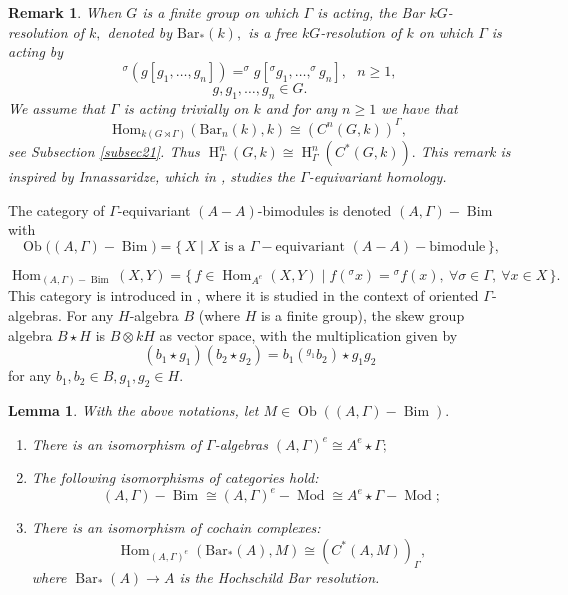 \documentclass[pdflatex,sn-mathphys-num]{sn-jnl}
\numberwithin{equation}{section}
\theoremstyle{thmstyleone}
\newtheorem{lemma}{Lemma}
\theoremstyle{thmstyletwo}
\newtheorem{remark}{Remark}
\theoremstyle{thmstylethree}
\newcommand{\Bim}{\operatorname{Bim}}
\newcommand{\Barc}{\operatorname{Bar}}
\newcommand{\Ob}{\operatorname{Ob}}
\newcommand{\Hom}{\operatorname{Hom}}
\newcommand{\Mod}{\operatorname{Mod}}
\newcommand{\Hrm}{\operatorname{H}}
\begin{document}
\begin{remark}
When $G$ is a finite group on which $\Gamma$ is acting, the Bar $kG$-resolution of $k,$ denoted by $\mathrm{Bar}_*(k),$ is a free $kG$-resolution of $k$ on which $\Gamma$ is acting by
  $$^{\sigma}(g[g_1,\dots,g_n])=^{\sigma}g[^{\sigma}g_1,\dots,^{\sigma}g_n],\mbox{ }n\geq 1,$$
  $$g,g_1,\dots,g_n\in G.$$ We assume that $\Gamma$ is acting trivially on $k$ and for any $n\geq 1$ we have that
    $$\mathrm{Hom}_{k(G\rtimes \Gamma)}(\mathrm{Bar}_n(k),k)\cong(C^n(G,k))^{\Gamma},$$
 see Subsection \ref{subsec21}. Thus $\Hrm_{\Gamma}^n(G,k)\cong\Hrm_{\Gamma}^n(C^*(G,k)).$ This remark is  inspired by Innassaridze,  which in  \cite[Section 5]{In}, studies the $\Gamma$-equivariant homology.
\end{remark}
The category of $\Gamma$-equivariant $(A-A)$-bimodules  is  denoted $(A,\Gamma)-\Bim$ with
$$
\Ob\big((A,\Gamma)-\Bim\big)
= \{\, X \mid X \text{ is a } \Gamma-\text{equivariant } (A-A)-\text{bimodule} \,\},
$$

$$
\Hom_{(A,\Gamma)-\Bim}(X,Y)
= \{\, f \in \Hom_{A^e}(X,Y) \mid
f({}^{\sigma}x) = {}^{\sigma}f(x),\ \forall \sigma \in \Gamma,\ \forall x \in X \,\}.
$$
This category is introduced in \citep{KoPi}, where it is studied in the context of oriented $\Gamma$-algebras. For any $H$-algebra $B$ (where $H$ is a finite group), the skew group algebra $B\star H$ is  $B\otimes kH$ as vector space, with the multiplication given by
\begin{equation}\label{eq61} (b_1\star g_1)(b_2 \star g_2)=b_1 ({ }^{g_1}b_2)\star g_1g_2
\end{equation}
 for any  $b_1,b_2\in B, g_1,g_2\in H.$
\begin{lemma}\label{lem71}
With the above notations, let $M \in \Ob((A,\Gamma)-\Bim).$
\begin{enumerate}
\item[(i)] There is an isomorphism of $\Gamma$-algebras $(A, \Gamma)^e \cong A^e \star\Gamma;$
\item[(ii)] The following isomorphisms of categories hold:
$$
(A,\Gamma)-\Bim \cong (A, \Gamma)^e-\Mod \cong A^e \star \Gamma-\Mod;
$$
\item[(iii)] There is an isomorphism of cochain complexes:
$$
\Hom_{(A,\Gamma)^e}(\mathrm{Bar}_*(A), M) \cong (C^*(A, M))_{\Gamma},$$
where $\Barc_*(A) \rightarrow A$ is the Hochschild Bar resolution.
\end{enumerate}
\end{lemma}
\end{document}
